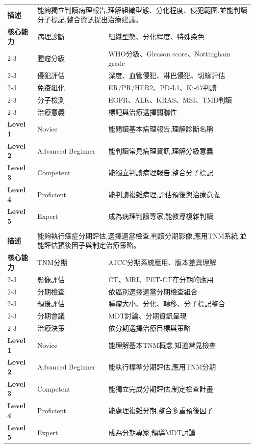\documentclass[12pt,a4paper]{article}
\begin{document}
\begin{longtable}{|p{1.2cm}|p{3.8cm}|p{8.5cm}|}
\rowcolor{onco_teal!10}
\multicolumn{3}{|c|}{\textbf{EPA 2: 病理報告與分子標記判讀}} \\
\hline
\textbf{描述} & \multicolumn{2}{|p{12.5cm}|}{能夠獨立判讀病理報告,理解組織型態、分化程度、侵犯範圍,並能判讀分子標記,整合資訊提出治療建議。} \\
\hline
\textbf{核心能力} & 病理診斷 & 組織型態、分化程度、特殊染色 \\
\cline{2-3}
& 腫瘤分級 & WHO分級、Gleason score、Nottingham grade \\
\cline{2-3}
& 侵犯評估 & 深度、血管侵犯、淋巴侵犯、切緣評估 \\
\cline{2-3}
& 免疫組化 & ER/PR/HER2、PD-L1、Ki-67判讀 \\
\cline{2-3}
& 分子檢測 & EGFR、ALK、KRAS、MSI、TMB判讀 \\
\cline{2-3}
& 治療意義 & 標記與治療選擇關聯性 \\
\hline
\textbf{Level 1} & Novice & 能閱讀基本病理報告,理解診斷名稱 \\
\hline
\textbf{Level 2} & Advanced Beginner & 能判讀常見病理資訊,理解分級意義 \\
\hline
\textbf{Level 3} & Competent & 能獨立判讀病理報告,整合分子標記 \\
\hline
\textbf{Level 4} & Proficient & 能判讀複雜病理,評估預後與治療意義 \\
\hline
\textbf{Level 5} & Expert & 成為病理判讀專家,能教導複雜判讀 \\
\hline

\rowcolor{onco_teal!10}
\multicolumn{3}{|c|}{\textbf{EPA 3: 癌症分期與預後評估}} \\
\hline
\textbf{描述} & \multicolumn{2}{|p{12.5cm}|}{能夠執行癌症分期評估,選擇適當檢查,判讀分期影像,應用TNM系統,並能評估預後因子與制定治療策略。} \\
\hline
\textbf{核心能力} & TNM分期 & AJCC分期系統應用、版本差異理解 \\
\cline{2-3}
& 影像評估 & CT、MRI、PET-CT在分期的應用 \\
\cline{2-3}
& 分期檢查 & 依癌別選擇適當分期檢查組合 \\
\cline{2-3}
& 預後評估 & 腫瘤大小、分化、轉移、分子標記整合 \\
\cline{2-3}
& 分期會議 & MDT討論、分期資訊呈現 \\
\cline{2-3}
& 治療決策 & 依分期選擇治療目標與策略 \\
\hline
\textbf{Level 1} & Novice & 能理解基本TNM概念,知道常見檢查 \\
\hline
\textbf{Level 2} & Advanced Beginner & 能執行標準分期評估,應用TNM分期 \\
\hline
\textbf{Level 3} & Competent & 能獨立完成分期評估,制定檢查計畫 \\
\hline
\textbf{Level 4} & Proficient & 能處理複雜分期,整合多重預後因子 \\
\hline
\textbf{Level 5} & Expert & 成為分期專家,領導MDT討論 \\
\hline


\end{longtable}
\end{document}
